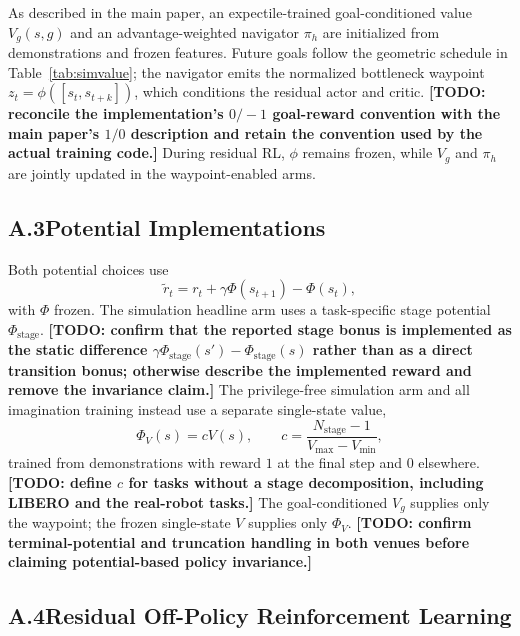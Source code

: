 \documentclass[letterpaper]{article} %
\newcommand{\todo}[1]{\textbf{[TODO: #1]}}
\begin{document}
As described in the main paper, an expectile-trained goal-conditioned value $V_g(s,g)$ and
an advantage-weighted navigator $\pi_h$ are initialized from demonstrations and frozen
features. Future goals follow the geometric schedule in Table~\ref{tab:simvalue}; the
navigator emits the normalized bottleneck waypoint
$z_t=\phi([s_t,s_{t+k}])$, which conditions the residual actor and critic.
\todo{reconcile the implementation's $0/-1$ goal-reward convention with the main paper's
$1/0$ description and retain the convention used by the actual training code.}
During residual RL, $\phi$ remains frozen, while $V_g$ and $\pi_h$ are jointly updated in
the waypoint-enabled arms.

\subsection{A.3\quad Potential Implementations}

Both potential choices use
\[
\tilde r_t=r_t+\gamma\Phi(s_{t+1})-\Phi(s_t),
\]
with $\Phi$ frozen. The simulation headline arm uses a task-specific stage potential
$\Phi_{\mathrm{stage}}$.
\todo{confirm that the reported stage bonus is implemented as the static difference
$\gamma\Phi_{\mathrm{stage}}(s')-\Phi_{\mathrm{stage}}(s)$ rather than as a direct
transition bonus; otherwise describe the implemented reward and remove the invariance
claim.}
The privilege-free simulation arm and all imagination training instead use a separate
single-state value,
\[
\Phi_V(s)=cV(s),\qquad
c=\frac{N_{\mathrm{stage}}-1}{V_{\max}-V_{\min}},
\]
trained from demonstrations with reward $1$ at the final step and $0$ elsewhere.
\todo{define $c$ for tasks without a stage decomposition, including LIBERO and the
real-robot tasks.} The goal-conditioned $V_g$ supplies only the waypoint; the frozen
single-state $V$ supplies only $\Phi_V$.
\todo{confirm terminal-potential and truncation handling in both venues before claiming
potential-based policy invariance.}

\subsection{A.4\quad Residual Off-Policy Reinforcement Learning}
\end{document}
